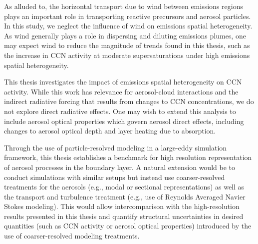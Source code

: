 As alluded to, the horizontal transport due to wind between emissions regions plays an important role in transporting reactive precursors and aerosol particles. In this study, we neglect the influence of wind on emissions spatial heterogeneity. As wind generally plays a role in dispersing and diluting emissions plumes, one may expect wind to reduce the magnitude of trends found in this thesis, such as the increase in CCN activity at moderate supersaturations under high emissions spatial heterogeneity.

This thesis investigates the impact of emissions spatial heterogeneity on CCN activity. While this work has relevance for aerosol-cloud interactions and the indirect radiative forcing that results from changes to CCN concentrations, we do not explore direct radiative effects. One may wish to extend this analysis to include aerosol optical properties which govern aerosol direct effects, including changes to aerosol optical depth and layer heating due to absorption.

Through the use of particle-resolved modeling in a large-eddy simulation framework, this thesis establishes a benchmark for high resolution representation of aerosol processes in the boundary layer. A natural extension would be to conduct simulations with similar setups but instead use coarser-resolved treatments for the aerosols (e.g., modal or sectional representations) as well as the transport and turbulence treatment (e.g., use of Reynolds Averaged Navier Stokes modeling). This would allow intercomparison with the high-resolution results presented in this thesis and quantify structural uncertainties in desired quantities (such as CCN activity or aerosol optical properties) introduced by the use of coarser-resolved modeling treatments.
 